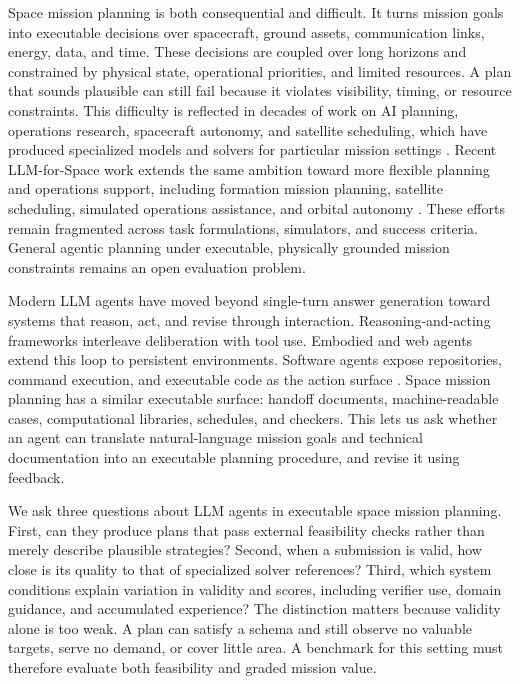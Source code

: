 \documentclass[11pt]{article}
\begin{document}
Space mission planning is both consequential and difficult. It turns mission goals into executable decisions over spacecraft, ground assets, communication links, energy, data, and time. These decisions are coupled over long horizons and constrained by physical state, operational priorities, and limited resources. A plan that sounds plausible can still fail because it violates visibility, timing, or resource constraints. This difficulty is reflected in decades of work on AI planning, operations research, spacecraft autonomy, and satellite scheduling, which have produced specialized models and solvers for particular mission settings \citep{johnston2006automating,lemaitrea2002selecting,he2018improved,lee2024satellite}. Recent LLM-for-Space work extends the same ambition toward more flexible planning and operations support, including formation mission planning, satellite scheduling, simulated operations assistance, and orbital autonomy \citep{zhang2025large,chen2025large,campanelli_2025_llm_satellite_ops,mousist_2025_astrea}. These efforts remain fragmented across task formulations, simulators, and success criteria. General agentic planning under executable, physically grounded mission constraints remains an open evaluation problem.

Modern LLM agents have moved beyond single-turn answer generation toward systems that reason, act, and revise through interaction. Reasoning-and-acting frameworks interleave deliberation with tool use. Embodied and web agents extend this loop to persistent environments. Software agents expose repositories, command execution, and executable code as the action surface \citep{yao2022react,wangvoyager,zhouwebarena,yang2024sweagent,wang2024codeact,wang2024openhands}. Space mission planning has a similar executable surface: handoff documents, machine-readable cases, computational libraries, schedules, and checkers. This lets us ask whether an agent can translate natural-language mission goals and technical documentation into an executable planning procedure, and revise it using feedback.

We ask three questions about LLM agents in executable space mission planning. First, can they produce plans that pass external feasibility checks rather than merely describe plausible strategies? Second, when a submission is valid, how close is its quality to that of specialized solver references? Third, which system conditions explain variation in validity and scores, including verifier use, domain guidance, and accumulated experience? The distinction matters because validity alone is too weak. A plan can satisfy a schema and still observe no valuable targets, serve no demand, or cover little area. A benchmark for this setting must therefore evaluate both feasibility and graded mission value.
\end{document}
